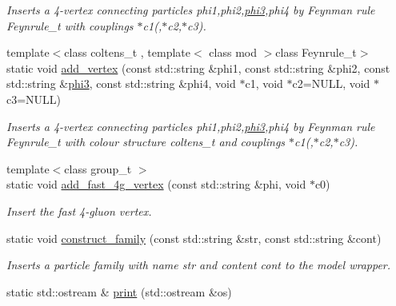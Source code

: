\begin{DoxyCompactItemize}
\begin{DoxyCompactList}\small\item\em Inserts a 4-\/vertex connecting particles phi1,phi2,\hyperlink{a00418}{phi3},phi4 by Feynman rule Feynrule\-\_\-t with couplings $\ast$c1(,$\ast$c2,$\ast$c3). \end{DoxyCompactList}\item 
\hypertarget{a00370_aebf3e4488323bb36b01109db552b28ae}{{\footnotesize template$<$class coltens\-\_\-t , template$<$ class mod $>$class Feynrule\-\_\-t$>$ }\\static void \hyperlink{a00370_aebf3e4488323bb36b01109db552b28ae}{add\-\_\-vertex} (const std\-::string \&phi1, const std\-::string \&phi2, const std\-::string \&\hyperlink{a00418}{phi3}, const std\-::string \&phi4, void $\ast$c1, void $\ast$c2=N\-U\-L\-L, void $\ast$c3=N\-U\-L\-L)}\label{a00370_aebf3e4488323bb36b01109db552b28ae}

\begin{DoxyCompactList}\small\item\em Inserts a 4-\/vertex connecting particles phi1,phi2,\hyperlink{a00418}{phi3},phi4 by Feynman rule Feynrule\-\_\-t with colour structure coltens\-\_\-t and couplings $\ast$c1(,$\ast$c2,$\ast$c3). \end{DoxyCompactList}\item 
{\footnotesize template$<$class group\-\_\-t $>$ }\\static void \hyperlink{a00370_a1a0e098a96a98c708e8d647e147eb9fe}{add\-\_\-fast\-\_\-4g\-\_\-vertex} (const std\-::string \&phi, void $\ast$c0)
\begin{DoxyCompactList}\small\item\em Insert the fast 4-\/gluon vertex. \end{DoxyCompactList}\item 
\hypertarget{a00370_a554b309bf5636ab532074419aa98c555}{static void \hyperlink{a00370_a554b309bf5636ab532074419aa98c555}{construct\-\_\-family} (const std\-::string \&str, const std\-::string \&cont)}\label{a00370_a554b309bf5636ab532074419aa98c555}

\begin{DoxyCompactList}\small\item\em Inserts a particle family with name str and content cont to the model wrapper. \end{DoxyCompactList}\item 
\hypertarget{a00370_ab599162e170d8234213fc107d5c6427a}{static std\-::ostream \& \hyperlink{a00370_ab599162e170d8234213fc107d5c6427a}{print} (std\-::ostream \&os)}\label{a00370_ab599162e170d8234213fc107d5c6427a}


\end{DoxyCompactItemize}
